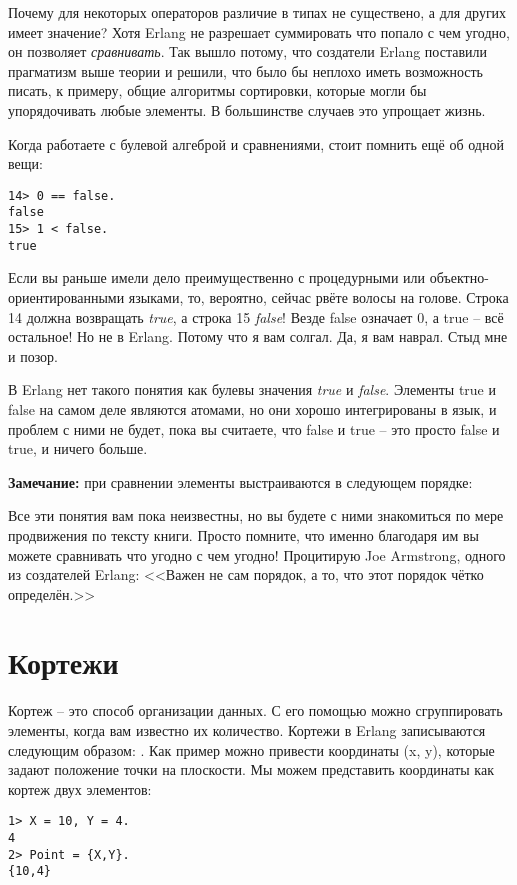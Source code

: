 Почему для некоторых операторов различие в типах не существено, а для других имеет значение?
Хотя Erlang не разрешает суммировать что попало с чем угодно, он позволяет \emph{сравнивать}.
Так вышло потому, что создатели Erlang поставили прагматизм выше теории и решили, что было бы неплохо иметь возможность писать, к примеру, общие алгоритмы сортировки, которые могли бы упорядочивать любые элементы.
В большинстве случаев это упрощает жизнь.

Когда работаете с булевой алгеброй и сравнениями, стоит помнить ещё об одной вещи:
\begin{lstlisting}[style=repl]
14> 0 == false.
false
15> 1 < false.
true
\end{lstlisting}

Если вы раньше имели дело преимущественно с процедурными или объектно\--ориентированными языками, то, вероятно, сейчас рвёте волосы на голове.
Строка 14 должна возвращать \emph{true}, а строка 15 \emph{false}!
Везде false означает 0, а true \--- всё остальное!
Но не в Erlang.
Потому что я вам солгал.
Да, я вам наврал.
Стыд мне и позор.

В Erlang нет такого понятия как булевы значения \emph{true} и \emph{false}.
Элементы true и false на самом деле являются атомами, но они хорошо интегрированы в язык, и проблем с ними не будет, пока вы считаете, что false и true \--- это просто false и true, и ничего больше.\\ 
\colorbox{lgray}
{
    \begin{minipage}{1.0\linewidth}
    \textbf{Замечание:} при сравнении элементы выстраиваются в следующем порядке:\\ 
    
    Все эти понятия вам пока неизвестны, но вы будете с ними знакомиться по мере продвижения по тексту книги.
    Просто помните, что именно благодаря им вы можете сравнивать что угодно с чем угодно!
    Процитирую Joe Armstrong, одного из создателей Erlang: <<Важен не сам порядок, а то, что этот порядок чётко определён.>>
    \end{minipage}
}
\section{Кортежи}
Кортеж \--- это способ организации данных.
С его помощью можно сгруппировать элементы, когда вам известно их количество.
Кортежи в Erlang записываются следующим образом: .
Как пример можно привести координаты (x, y), которые задают положение точки на плоскости.
Мы можем представить координаты как кортеж двух элементов:
\begin{lstlisting}[style=repl]
1> X = 10, Y = 4.
4
2> Point = {X,Y}.
{10,4}
\end{lstlisting}

